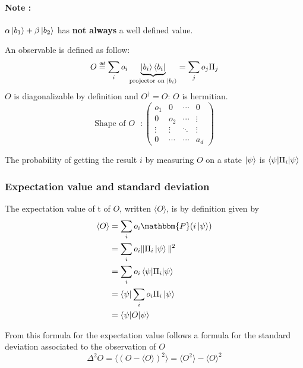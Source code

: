 \documentclass{article}
\newcommand\eqdef{\mathrel{\overset{\makebox[0pt]{\mbox{\normalfont\tiny\sffamily def}}}{=}}}
\begin{document}
\paragraph{Note :} $\alpha\ket{b_1} + \beta\ket{b_2}$ has \textbf{not always} a well defined value.

An observable is defined as follow:
\begin{equation}
    O \eqdef \sum_i o_i \underbrace{\ket{b_i}\bra{b_i}}_{\text{projector on $\ket{b_i}$}}
    = \sum_j o_j \Pi_j
\end{equation}
$O$ is diagonalizable by definition and $O^\dagger = O$: $O$ is hermitian.
$$
\text{Shape of $O$ } :
\begin{pmatrix}
    o_1 & 0 & \cdots & 0 \\
    0 & o_2 & \cdots & \vdots \\
    \vdots  & \vdots  & \ddots & \vdots  \\
    0 & \cdots & \cdots & a_d
\end{pmatrix}
$$

The probability of getting the result $i$ by measuring $O$ on a state $\ket{\psi}$ is $\braket{\psi|\Pi_i|\psi}$
\subsubsection{Expectation value and standard deviation}

The expectation value of t of $O$, written $\langle O\rangle$, is by definition given by
\begin{equation}
    \begin{aligned}
        \langle O\rangle
            & = \sum_i o_i \mathbbm{P}(i\ket{\psi}) \\
            & = \sum_i o_i \|\Pi_i\ket{\psi}\|^2 \\
            & = \sum_i o_i \braket{\psi|\Pi_i|\psi} \\
            & = \bra{\psi}\sum_i o_i \Pi_i \ket{\psi} \\
            & = \braket{\psi | O |\psi}
    \end{aligned}
\end{equation}

From this formula for the expectation value follows a formula for the standard deviation associated to the observation of $O$
\begin{equation}
    \Delta^2 O = \langle(O - \langle O \rangle)^2\rangle = \langle O^2 \rangle - \langle O \rangle^2
\end{equation}
\end{document}
